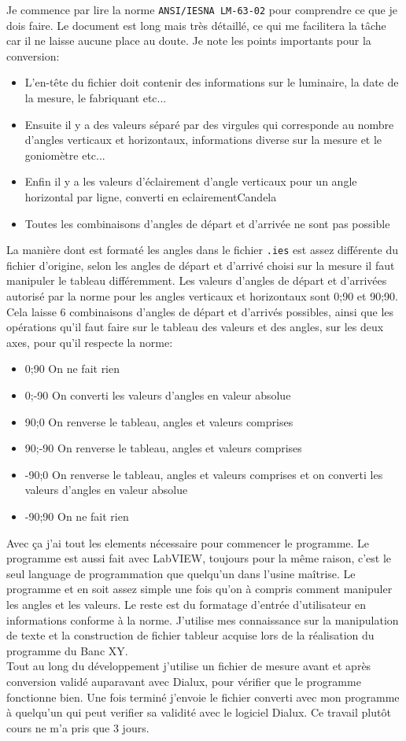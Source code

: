 \documentclass[12pt]{article}
\begin{document}
Je commence par lire la norme \verb|ANSI/IESNA LM-63-02| pour comprendre ce que je dois faire.
Le document est long mais très détaillé, ce qui me facilitera la tâche car il ne laisse aucune place au doute.
Je note les points importants pour la conversion:
\begin{itemize}
	\item L'en-tête du fichier doit contenir des informations sur le luminaire, la date de la mesure, le fabriquant etc...
	\item Ensuite il y a des valeurs séparé par des virgules qui corresponde au nombre d'angles verticaux et horizontaux, informations diverse sur la mesure et le goniomètre etc...
	\item Enfin il y a les valeurs d'éclairement d'angle verticaux pour un angle horizontal par ligne, converti en \gls{eclairementCandela} 
	\item Toutes les combinaisons d'angles de départ et d'arrivée ne sont pas possible
\end{itemize}
La manière dont est formaté les angles dans le fichier \verb|.ies| est assez différente du fichier d'origine, selon les angles de départ et d'arrivé choisi sur la mesure il faut manipuler le tableau différemment.
Les valeurs d'angles de départ et d'arrivées autorisé par la norme pour les angles verticaux et horizontaux sont 0;90 et 90;90.\\
Cela laisse 6 combinaisons d'angles de départ et d'arrivés possibles, ainsi que les opérations qu'il faut faire sur le tableau des valeurs et des angles, sur les deux axes, pour qu'il respecte la norme:
\begin{itemize}
	\item 0;90 On ne fait rien
	\item 0;-90 On converti les valeurs d'angles en valeur absolue
	\item 90;0 On renverse le tableau, angles et valeurs comprises
	\item 90;-90 On renverse le tableau, angles et valeurs comprises
	\item -90;0 On renverse le tableau, angles et valeurs comprises et on converti les valeurs d'angles en valeur absolue
	\item -90;90 On ne fait rien
\end{itemize}


Avec ça j'ai tout les elements nécessaire pour commencer le programme.
Le programme est aussi fait avec LabVIEW, toujours pour la même raison, c'est le seul language de programmation que quelqu'un dans l'usine maîtrise.
Le programme et en soit assez simple une fois qu'on à compris comment manipuler les angles et les valeurs.
Le reste est du formatage d'entrée d'utilisateur en informations conforme à la norme.
J'utilise mes connaissance sur la manipulation de texte et la construction de fichier tableur acquise lors de la réalisation du programme du Banc XY.\\
Tout au long du développement j'utilise un fichier de mesure avant et après conversion validé auparavant avec Dialux, pour vérifier que le programme fonctionne bien.
Une fois terminé j'envoie le fichier converti avec mon programme à quelqu'un qui peut verifier sa validité avec le logiciel Dialux.
Ce travail plutôt cours ne m'a pris que 3 jours.
\end{document}
